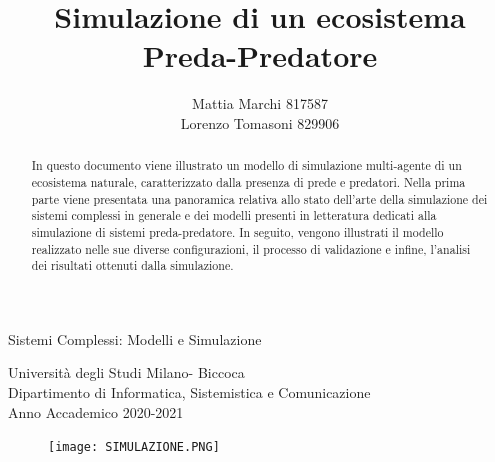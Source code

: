 \documentclass[11pt]{article}
\begin{document}
\title{Simulazione di un ecosistema Preda-Predatore}

\author{Mattia Marchi 817587 \\
Lorenzo Tomasoni 829906 }

\date{}

\maketitle

\vspace{5cm}

\begin{center}
\Large{Sistemi Complessi: Modelli e Simulazione}

\vspace{4cm}

\large{Università degli Studi Milano- Biccoca \\
Dipartimento di Informatica, Sistemistica e Comunicazione \\
Anno Accademico 2020-2021}
\end{center}

\newpage

\begin{abstract}
    In questo documento viene illustrato un modello di simulazione multi-agente di un ecosistema naturale, caratterizzato dalla presenza di prede e predatori. Nella prima parte viene presentata una panoramica relativa allo stato dell'arte della simulazione dei sistemi complessi in generale e dei modelli presenti in letteratura dedicati alla simulazione di sistemi preda-predatore. In seguito, vengono illustrati il modello realizzato nelle sue diverse configurazioni, il processo di validazione e infine, l'analisi dei risultati ottenuti dalla simulazione. 
    
    \vspace{3cm}
    
\end{abstract}

\vspace{1.5cm}

\begin{figure}[h]
    \hspace{-1cm}
    \texttt{[image: SIMULAZIONE.PNG]}
\end{figure}
\end{document}
